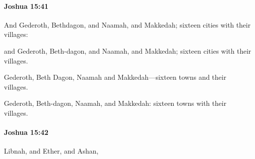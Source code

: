 		\paragraph{Joshua 15:41} %
			\label{JOSHUA-15-41}

			And Gederoth, Bethdagon, and Naamah, and Makkedah; sixteen cities with their villages:

			\begin{versebox}
					\item[BHS] 
					\item[ASV] and Gederoth, Beth-dagon, and Naamah, and Makkedah; sixteen cities with their villages.
					\item[NIV] Gederoth, Beth Dagon, Naamah and Makkedah—sixteen towns and their villages.
					\item[NRSV] Gederoth, Beth-dagon, Naamah, and Makkedah: sixteen towns with their villages.
			\end{versebox}

		\paragraph{Joshua 15:42} %
			\label{JOSHUA-15-42}

			Libnah, and Ether, and Ashan,

